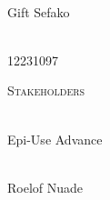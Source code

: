 \begin{titlepage}
\begin{center}
		
		\begin{minipage}{0.4\textwidth}
			\begin{flushleft} \large
				\emph{} \\
				Gift {Sefako }
			\end{flushleft}
		\end{minipage}
		\begin{minipage}{0.4\textwidth}
			\begin{flushright} \large
				\emph{} \\
				12231097
			\end{flushright}
		\end{minipage}
		
		\textsc{\Large Stakeholders}\\[1cm]	
		
		\begin{minipage}{0.4\textwidth}
			\begin{flushleft} \large
				\emph{} \\
				Epi-Use Advance
			\end{flushleft}
		\end{minipage}
		\begin{minipage}{0.4\textwidth}
			\begin{flushright} \large
				\emph{} \\
				Roelof Nuade
			\end{flushright}
		\end{minipage}
		
	\end{center}
\end{titlepage}